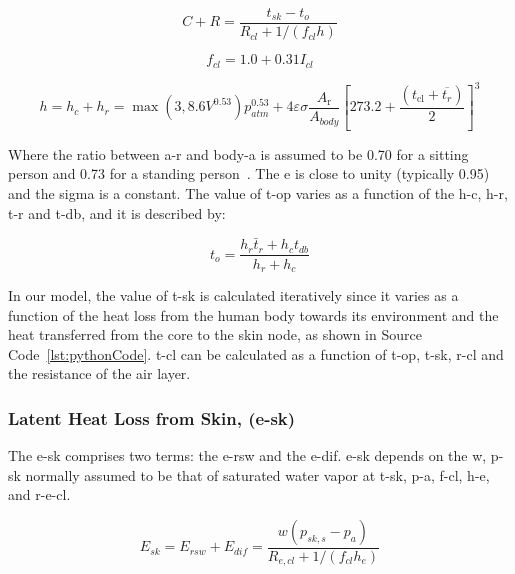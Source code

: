 \begin{equation}
    C+R=\frac{t_{s k}-t_{o}}{R_{c l}+1 /\left(f_{c l} h\right)}\label{eq:c-r}
\end{equation}

\begin{equation}
    f_{cl}=1.0 + 0.31 I_{cl} \label{eq:f-cl}
\end{equation}

\begin{equation}
    h=h_{c} + h_{r} = \max(3, 8.6 V^{0.53}) p_{atm}^{0.53} + 4 \varepsilon \sigma \frac{A_{\mathrm{r}}}{A_{body}}\left[273.2+\frac{\left(t_{\mathrm{cl}}+\overline{t_{r}}\right)}{2}\right]^{3}\label{eq:h}
\end{equation}

Where the ratio between \ac{a-r} and \ac{body-a} is assumed to be 0.70 for a sitting person and 0.73 for a standing person~\cite{Fanger1967}.
The \ac{e} is close to unity (typically 0.95) and the \ac{sigma} is a constant.
The value of \ac{t-op} varies as a function of the \ac{h-c}, \ac{h-r}, \ac{t-r} and \ac{t-db}, and it is described by:

\begin{equation}
    t_{o}=\frac{h_{r} \bar{t}_{r}+h_{c} t_{db}}{h_{r}+h_{c}}\label{eq:t-op}
\end{equation}

In our model, the value of \ac{t-sk} is calculated iteratively since it varies as a function of the heat loss from the human body towards its environment and the heat transferred from the core to the skin node, as shown in Source Code~\ref{lst:pythonCode}.
\Ac{t-cl} can be calculated as a function of \ac{t-op}, \ac{t-sk}, \ac{r-cl} and the resistance of the air layer.

\subsubsection{Latent Heat Loss from Skin, (\acs{e-sk})}

The \acf{e-sk} comprises two terms: the \ac{e-rsw} and the \ac{e-dif}.
\ac{e-sk} depends on the \ac{w}, \ac{p-sk} normally assumed to be that of saturated water vapor at \ac{t-sk}, \ac{p-a}, \ac{f-cl}, \ac{h-e}, and \ac{r-e-cl}.

\begin{equation}
    E_{s k}=E_{rsw}+E_{dif}=\frac{w\left(p_{s k, s}-p_{a}\right)}{R_{e, c l}+1 /\left(f_{c l} h_{e}\right)}\label{eq:latent-skin}
\end{equation}

